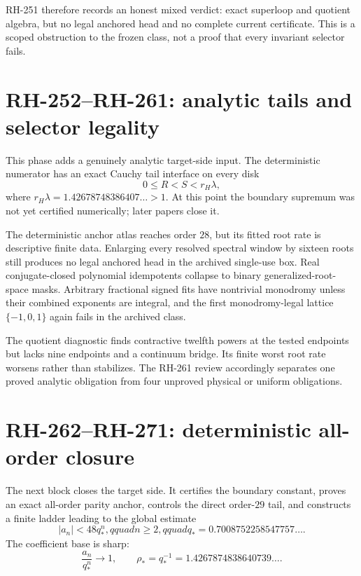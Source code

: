 \documentclass[11pt]{article}
\theoremstyle{definition}
\theoremstyle{remark}
\begin{document}
RH-251 therefore records an honest mixed verdict: exact superloop and
quotient algebra, but no legal anchored head and no complete current
certificate.  This is a scoped obstruction to the frozen class, not a proof
that every invariant selector fails.

\section{RH-252--RH-261: analytic tails and selector legality}

This phase adds a genuinely analytic target-side input.  The deterministic
numerator has an exact Cauchy tail interface on every disk
\[
 0\le R<S<r_H\lambda,
\]
where $r_H\lambda=1.42678748386407\ldots>1$.  At this point the boundary
supremum was not yet certified numerically; later papers close it.

The deterministic anchor atlas reaches order $28$, but its fitted root rate
is descriptive finite data.  Enlarging every resolved spectral window by
sixteen roots still produces no legal anchored head in the archived
single-use box.  Real conjugate-closed polynomial idempotents collapse to
binary generalized-root-space masks.  Arbitrary fractional signed fits have
nontrivial monodromy unless their combined exponents are integral, and the
first monodromy-legal lattice $\{-1,0,1\}$ again fails in the archived class.

The quotient diagnostic finds contractive twelfth powers at the tested
endpoints but lacks nine endpoints and a continuum bridge.  Its finite worst
root rate worsens rather than stabilizes.  The RH-261 review accordingly
separates one proved analytic obligation from four unproved physical or
uniform obligations.

\section{RH-262--RH-271: deterministic all-order closure}

The next block closes the target side.  It certifies the boundary constant,
proves an exact all-order parity anchor, controls the direct order-$29$ tail,
and constructs a finite ladder leading to the global estimate
\begin{equation}\label{eq:envelope}
 |a_n|<48q_*^n,qquad n\ge2,qquad
 q_*=0.7008752258547757\ldots.
\end{equation}
The coefficient base is sharp:
\begin{equation}\label{eq:sharp}
 \frac{a_n}{q_*^n}\longrightarrow1,
 \qquad
 \rho_*=q_*^{-1}=1.4267874838640739\ldots.
\end{equation}
\end{document}
